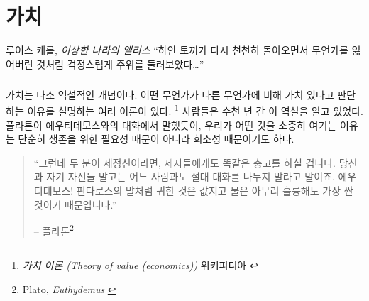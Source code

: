 \chapter{가치}
\label{les:10}

\begin{chapquote}{루이스 캐롤, \textit{이상한 나라의 앨리스}}
	\enquote{하얀 토끼가 다시 천천히 돌아오면서 무언가를 잃어버린 것처럼 걱정스럽게 주위를 둘러보았다\ldots}
\end{chapquote}

\paragraph{}
가치는 다소 역설적인 개념이다. 
어떤 무언가가 다른 무언가에 비해 가치 있다고 판단하는 이유를 설명하는 여러 이론이 있다.
\footnote{\textit{가치 이론 (Theory of value (economics))} 위키피디아 \cite{wiki:theory-of-value}}
사람들은 수천 년 간 이 역설을 알고 있었다. 
플라톤이 에우티데모스와의 대화에서 말했듯이, 우리가 어떤 것을 소중히 여기는 이유는 단순히 생존을 위한 필요성 때문이 아니라 희소성 때문이기도 하다.

\begin{quotation}\begin{samepage}
		\enquote{그런데 두 분이 제정신이라면, 제자들에게도 똑같은 충고를 하실 겁니다.
			당신과 자기 자신들 말고는 어느 사람과도 절대 대화를 나누지 말라고 말이죠.
			에우티데모스! 핀다로스의 말처럼 귀한 것은 값지고 물은 아무리 훌륭해도 가장 싼 것이기 때문입니다.}
		\begin{flushright} -- 플라톤\footnote{Plato, \textit{Euthydemus} \cite{euthydemus}}
\end{flushright}\end{samepage}\end{quotation}


